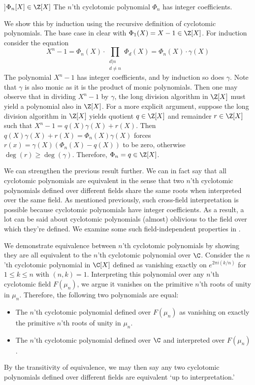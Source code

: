 \begin{theorem}[Phi_n(X) is in Z[X]]{$\Phi_n[X]\in\Z[X]$}
    The $n$'th cyclotomic polynomial $\Phi_n$ has integer coefficients.

    \proof
    We show this by induction using the recursive definition of cyclotomic polynomials.
    The base case in clear with $\Phi_1(X)=X-1\in\Z[X]$.
    For induction consider the equation
    \begin{equation}
        X^n-1 = \Phi_n(X) \cdot
        \prod_{\substack{d|n\\d\neq n}}\Phi_d(X) = \Phi_n(X)\cdot\gamma(X)
    \end{equation}
    The polynomial $X^n-1$ has integer coefficients, and by induction so does $\gamma$.
    Note that $\gamma$ is also monic as it is the product of monic polynomials.
    Then one may observe that in dividing $X^n-1$ by $\gamma$, the long division algorithm in $\Z[X]$ must yield a polynomial also in $\Z[X]$.
    For a more explicit argument, suppose the long division algorithm in $\Z[X]$ yields quotient $q\in\Z[X]$ and remainder $r\in\Z[X]$ such that $X^n-1=q(X)\gamma(X)+r(X)$.
    Then $q(X)\gamma(X)+r(X)=\Phi_n(X)\gamma(X)$ forces $r(x)=\gamma(X)(\Phi_n(X)-q(X))$ to be zero, otherwise $\deg(r)\geq\deg(\gamma)$.
    Therefore, $\Phi_n=q\in\Z[X]$.
\end{theorem}

We can strengthen the previous result further.
We can in fact say that all cyclotomic polynomials are equivalent in the sense that two $n$'th cyclotomic polynomials defined over different fields share the same roots when interpreted over the same field.
As mentioned previously, such cross-field interpretation is possible because cyclotomic polynomials have integer coefficients.
As a result, a lot can be said about cyclotomic polynomials (almost) oblivious to the field over which they're defined.
We examine some such field-independent properties in .

We demonstrate equivalence between $n$'th cyclotomic polynomials by showing they are all equivalent to the $n$'th cyclotomic polynomial over $\C$.
Consider the $n$'th cyclotomic polynomial in $\C[X]$ defined as vanishing exactly on $e^{2\pi i(k/n)}$ for $1\leq k\leq n$ with $(n,k)=1$.
Interpreting this polynomial over any $n$'th cyclotomic field $F(\mu_n)$, we argue it vanishes on the primitive $n$'th roots of unity in $\mu_n$.
Therefore, the following two polynomials are equal:
\begin{itemize}
    \item
    The $n$'th cyclotomic polynomial defined over $F(\mu_n)$ as vanishing on exactly the primitive $n$'th roots of unity in $\mu_n$.
    \item
    The $n$'th cyclotomic polynomial defined over $\C$ and interpreted over $F(\mu_n)$.
\end{itemize}
By the transitivity of equivalence, we may then say any two cyclotomic polynomials defined over different fields are equivalent `up to interpretation.'

